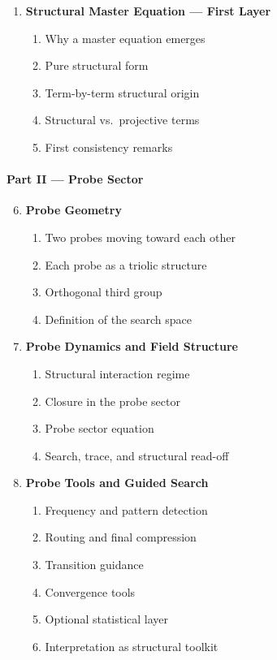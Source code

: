 \documentclass[12pt,a4paper]{article}
\begin{document}
\begin{enumerate}[leftmargin=2em,label=\arabic*.]
\begin{enumerate}[label*=\arabic*., leftmargin=2.5em]
 \item Structural consequences
 \end{enumerate}
 \item \textbf{Structural Master Equation --- First Layer}
 \begin{enumerate}[label*=\arabic*., leftmargin=2.5em]
 \item Why a master equation emerges
 \item Pure structural form
 \item Term-by-term structural origin
 \item Structural vs.\ projective terms
 \item First consistency remarks
 \end{enumerate}
\end{enumerate}

\paragraph{Part II --- Probe Sector}
\begin{enumerate}[leftmargin=2em,label=\arabic*.]
 \setcounter{enumi}{5}
 \item \textbf{Probe Geometry}
 \begin{enumerate}[label*=\arabic*., leftmargin=2.5em]
 \item Two probes moving toward each other
 \item Each probe as a triolic structure
 \item Orthogonal third group
 \item Definition of the search space
 \end{enumerate}
 \item \textbf{Probe Dynamics and Field Structure}
 \begin{enumerate}[label*=\arabic*., leftmargin=2.5em]
 \item Structural interaction regime
 \item Closure in the probe sector
 \item Probe sector equation
 \item Search, trace, and structural read-off
 \end{enumerate}
 \item \textbf{Probe Tools and Guided Search}
 \begin{enumerate}[label*=\arabic*., leftmargin=2.5em]
 \item Frequency and pattern detection
 \item Routing and final compression
 \item Transition guidance
 \item Convergence tools
 \item Optional statistical layer
 \item Interpretation as structural toolkit
 \end{enumerate}
\end{enumerate}
\end{document}
